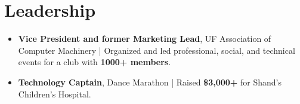 \documentclass[letterpaper,11pt]{article}
\newcommand{\leaderShip}[1]{
    \item\small{
    {#1 \vspace{-5pt}}
  }
}
\newcommand{\resumeSubHeadingListStart}{\begin{itemize}[leftmargin=0.15in, label={}]}
\newcommand{\resumeSubHeadingListEnd}{\end{itemize}\vspace{-12pt}}
\begin{document}


\section{Leadership}
    \resumeSubHeadingListStart
    
    \leaderShip
        {\textbf{Vice President and former Marketing Lead}, UF Association of Computer Machinery | Organized and led professional, social, and technical events for a club with \textbf{1000+ members}.}
          
       \leaderShip
          {\textbf{Technology Captain}, Dance Marathon |  Raised \textbf{\$3,000+} for Shand's Children’s Hospital.}
          
          
          
    \resumeSubHeadingListEnd


\end{document}
